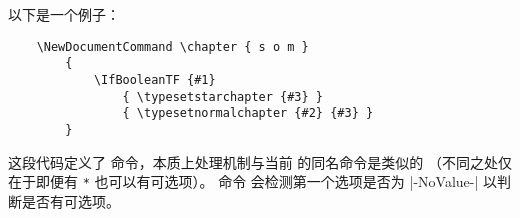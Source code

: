 \documentclass{l3doc}
\begin{document}
以下是一个例子：
\begin{verbatim}
    \NewDocumentCommand \chapter { s o m }
        {
            \IfBooleanTF {#1}
                { \typesetstarchapter {#3} }
                { \typesetnormalchapter {#2} {#3} }
        }
\end{verbatim}
%
这段代码定义了  命令，本质上处理机制与当前 \LaTeXe{} 的同名命令是类似的
（不同之处仅在于即便有 \texttt{*} 也可以有可选项）。
命令   会检测第一个选项是否为 |-NoValue-| 以判断是否有可选项。
\end{document}
